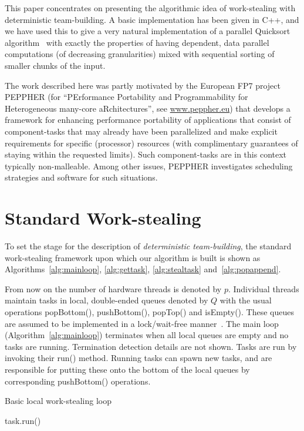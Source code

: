 \documentclass[preprint]{sigplanconf}
\begin{document}
This paper concentrates on presenting the algorithmic idea of
work-stealing with deterministic team-building. A basic implementation
has been given in C++, and we have used this to give a very natural
implementation of a parallel Quicksort
algorithm~\cite{TsigasZhang03} with exactly the properties of having
dependent, data parallel computations (of decreasing granularities)
mixed with sequential sorting of smaller chunks of the input.

The work described here was partly motivated by the European FP7
project PEPPHER (for ``PErformance Portability and Programmability for
Heterogeneous many-core aRchitectures'', see \url{www.peppher.eu})
that develops a framework for enhancing performance portability of
applications that consist of component-tasks that may already have
been parallelized and make explicit requirements for specific
(processor) resources (with complimentary guarantees of staying within
the requested limits). Such component-tasks are in this context typically
non-malleable. Among other issues, PEPPHER investigates scheduling
strategies and software for such situations.

\section{Standard Work-stealing}

To set the stage for the description of \emph{deterministic team-building}, 
the standard work-stealing framework upon which our algorithm is built is
shown as Algorithms~\ref{alg:mainloop}, \ref{alg:gettask}, \ref{alg:stealtask}
and~\ref{alg:popappend}.

From now on the number of hardware threads is denoted by $p$.
Individual threads maintain tasks in local, double-ended queues
denoted by $Q$ with the usual operations popBottom(), pushBottom(),
popTop() and isEmpty(). These queues are assumed to be implemented in
a lock/wait-free
manner~\cite{AroraBlumofePlaxton01,HerlihyShavit08}. The main loop
(Algorithm~\ref{alg:mainloop}) terminates when all local queues are
empty and no tasks are running. Termination detection details are not
shown. Tasks are run by invoking their run() method.  Running tasks
can spawn new tasks, and are responsible for putting these onto the bottom of
the local queues by corresponding pushBottom() operations.

\begin{algorithm}
\begin{algorithmic}[1]
\caption{Basic local work-stealing loop}\label{alg:mainloop}
\STATE{}
	\STATE task.run()
\ENDWHILE
\end{algorithmic}
\end{algorithm}
\end{document}
